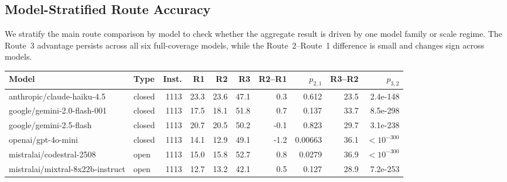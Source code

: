 \subsection{Model-Stratified Route Accuracy}
\label{app:model_stratified_route_accuracy}

We stratify the main route comparison by model to check whether the aggregate result is driven by one model family or scale regime. The Route~3 advantage persists across all six full-coverage models, while the Route~2--Route~1 difference is small and changes sign across models.

\begin{center}
\footnotesize
\setlength{\tabcolsep}{3pt}
\begin{tabular*}{\textwidth}{@{\extracolsep{\fill}}>{\raggedright\arraybackslash}p{}lrrrrrrrr@{}}
\toprule
Model & Type & Inst. & R1 & R2 & R3 & R2--R1 & $p_{2,1}$ & R3--R2 & $p_{3,2}$ \\
\midrule
anthropic/claude-haiku-4.5 & closed & 1113 & 23.3 & 23.6 & 47.1 & 0.3 & 0.612 & 23.5 & 2.4e-148 \\
google/gemini-2.0-flash-001 & closed & 1113 & 17.5 & 18.1 & 51.8 & 0.7 & 0.137 & 33.7 & 8.5e-298 \\
google/gemini-2.5-flash & closed & 1113 & 20.7 & 20.5 & 50.2 & -0.1 & 0.823 & 29.7 & 3.1e-238 \\
openai/gpt-4o-mini & closed & 1113 & 14.1 & 12.9 & 49.1 & -1.2 & 0.00663 & 36.1 & $<10^{-300}$ \\
mistralai/codestral-2508 & open & 1113 & 15.0 & 15.8 & 52.7 & 0.8 & 0.0279 & 36.9 & $<10^{-300}$ \\
mistralai/mixtral-8x22b-instruct & open & 1113 & 12.7 & 13.2 & 42.1 & 0.5 & 0.127 & 28.9 & 7.2e-253 \\
\bottomrule
\end{tabular*}
\label{tab:appendix_model_routes}
\end{center}

